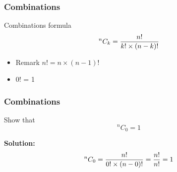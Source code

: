 \documentclass[a4]{beamer}
\begin{document}
\begin{frame}
\frametitle{Combinations}
Combinations formula
\[ ^{n}C_k  = {n! \over k!  \times (n-k)!} \]

\begin{itemize}
\item Remark $n! = n \times (n-1)! $
\item 0! = 1
\end{itemize}
\end{frame}
\begin{frame}
\frametitle{Combinations}
Show that
\[ ^{n}C_0  = 1 \]

\textbf{Solution: }
\[ ^{n}C_0  = {n! \over 0!  \times (n-0)!} =  {n! \over n!} = 1 \]

\end{frame}
\end{document}
